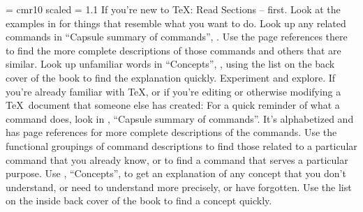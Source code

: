 


{\font\rm = cmr10 scaled \magstephalf \baselineskip = 1.1\baselineskip
If you're new to \TeX:
\ulist
\li Read Sections -- first.
\li Look at the examples in 
for things that resemble what you want to do.
Look up any related commands in ``Capsule summary of commands'',
.
Use the page references there to find the more complete descriptions of
those commands and others that are similar.
\li Look up unfamiliar words in ``Concepts'', ,
using the list on the back cover of the book to find the
explanation quickly.
\li Experiment and explore.
\endulist
\bigskip
\noindent
If you're already familiar with \TeX, or if you're editing or
otherwise modifying a \TeX\ document that someone else has created:
\ulist
\li For a quick reminder of what a command does, look in
, ``Capsule summary of commands''.  It's
alphabetized and has page references for more complete descriptions of
the commands.
\li Use the functional groupings of command descriptions
to find those related to a
particular command that you already know, or to find a command that serves a
particular purpose.
\li Use , ``Concepts'', to get an explanation of
any concept that you don't understand, or need to understand more
precisely, or have forgotten.
Use the list on the inside back cover of the book to find a concept quickly.
\endulist
}
\pagebreak

\byebye
